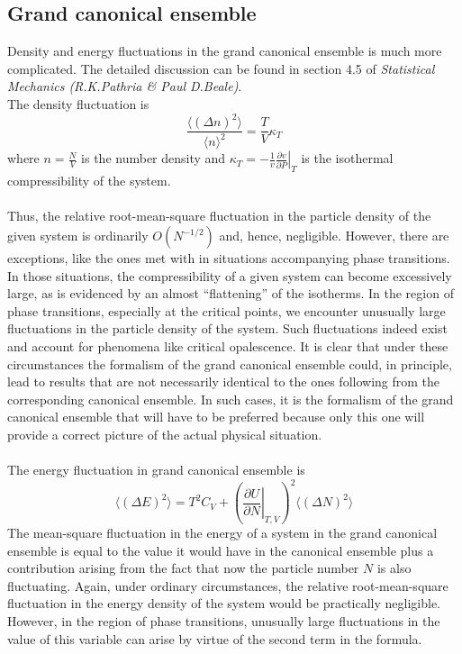 \subsection{Grand canonical ensemble}
Density and energy fluctuations in the grand canonical ensemble is much more complicated. The detailed discussion can be found in section 4.5 of \emph{Statistical Mechanics (R.K.Pathria \& Paul D.Beale)}. 
\\
The density fluctuation is
\[\frac{\langle (\Delta n)^2 \rangle}{\langle n \rangle^2} = \frac{T}{V}\kappa_T\]
where $ n = \frac{N}{V}$ is the number density and $\kappa_T = -\frac{1}{v} \left. \frac{\partial v}{\partial P} \right|_{T}$ is the isothermal compressibility of the system.
\\ \\
Thus, the relative root-mean-square fluctuation in the particle density of the given system is ordinarily $O(N^{-1/2})$ and, hence, negligible. However, there are exceptions, like the ones met with in situations accompanying phase transitions. In those situations, the compressibility of a given system can become excessively large, as is evidenced by an almost ``flattening'' of the isotherms. In the region of phase transitions, especially at the critical points, we encounter unusually large fluctuations in the particle density of the system. Such fluctuations indeed exist and account for phenomena like critical opalescence. It is clear that under these circumstances the formalism of the grand canonical ensemble could, in principle, lead to results that are not necessarily identical to the ones following from the corresponding canonical ensemble. In such cases, it is the formalism of the grand canonical ensemble that will have to be preferred because only this one will provide a correct picture of the actual physical situation.
\\ \\
The energy fluctuation in grand canonical ensemble is 
\[\langle (\Delta E)^2 \rangle = T^2C_V + \left(\left. \frac{\partial U}{\partial N} \right|_{T,V} \right)^2 \langle (\Delta N)^2 \rangle\]
The mean-square fluctuation in the energy of a system in the grand canonical ensemble is equal to the value it would have in the canonical ensemble plus a contribution arising from the fact that now the particle number $N$ is also fluctuating. Again, under ordinary circumstances, the relative root-mean-square fluctuation in the energy density of the system would be practically negligible. However, in the region of phase transitions, unusually large fluctuations in the value of this variable can arise by virtue of the second term in the formula.


